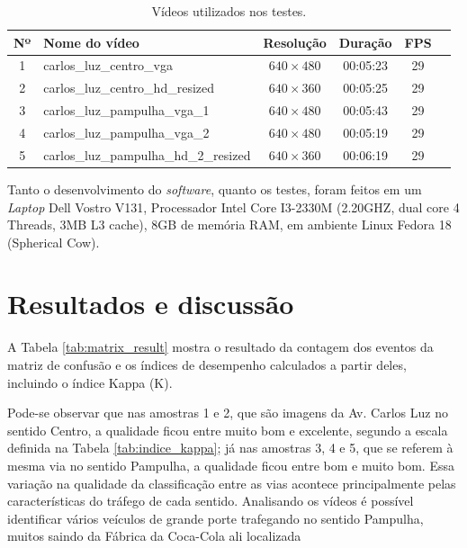 \begin{table}[ht]
  \caption{Vídeos utilizados nos testes.}
  \label{tab:videos_teste}
  \begin{center}
    \begin{tabular}{clcccc}
    \toprule
    \textbf{Nº} & \textbf{Nome do vídeo} & \textbf{Resolução} & \textbf{Duração} & \textbf{FPS} \\
    \midrule
      1 & carlos\_luz\_centro\_vga & $ 640\times 480 $ & 00:05:23 & 29 \\
      2 & carlos\_luz\_centro\_hd\_resized & $ 640\times 360 $ & 00:05:25 & 29 \\
      3 & carlos\_luz\_pampulha\_vga\_1 & $ 640\times 480 $ & 00:05:43 & 29 \\
      4 & carlos\_luz\_pampulha\_vga\_2 & $ 640\times 480 $ & 00:05:19 & 29 \\
      5 & carlos\_luz\_pampulha\_hd\_2\_resized & $ 640\times 360 $ & 00:06:19 & 29 \\
    \bottomrule
    \end{tabular}
  \end{center}
\end{table}

Tanto o desenvolvimento do \textit{software}, quanto os testes, foram feitos em um \textit{Laptop} Dell Vostro V131, Processador Intel Core I3-2330M (2.20GHZ, dual core 4 Threads, 3MB L3 cache), 8GB de memória RAM, em ambiente Linux Fedora 18 (Spherical Cow).


\section{Resultados e discussão} %
\label{sec:resultados_e_discuss_o}

A Tabela \ref{tab:matrix_result} mostra o resultado da contagem dos eventos da matriz de confusão e os índices de desempenho calculados a partir deles, incluindo o índice Kappa (K). 

Pode-se observar que nas amostras 1 e 2, que são imagens da Av. Carlos Luz no sentido Centro, a qualidade ficou entre muito bom e excelente, segundo a escala definida na Tabela \ref{tab:indice_kappa}; já  nas amostras 3, 4 e 5, que se referem à mesma via no sentido Pampulha, a qualidade ficou entre bom e muito bom. Essa variação na qualidade da classificação entre as vias acontece principalmente pelas características do tráfego de cada sentido. Analisando os vídeos é possível identificar vários veículos de grande porte trafegando no sentido Pampulha, muitos saindo da Fábrica da Coca-Cola ali localizada 

